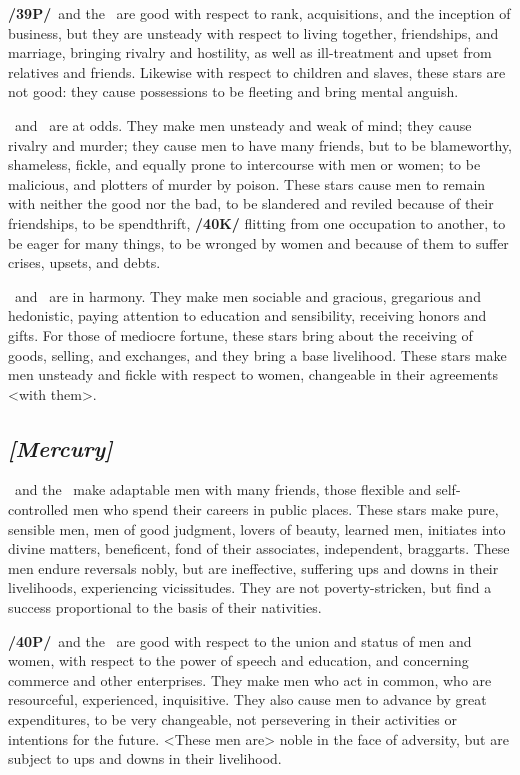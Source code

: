 \textbf{/39P/}\Venus\, and the \Moon\, are good with respect to rank, acquisitions, and the inception of business,
but they are unsteady with respect to living together, friendships, and marriage, bringing rivalry and hostility, as well as ill-treatment and upset from relatives and friends. Likewise with respect to children and slaves, these stars are not good: they cause possessions to be fleeting and bring mental anguish.

\Venus\, and \Mars\, are at odds. They make men unsteady and weak of mind; they cause rivalry and murder; they cause men to have many friends, but to be blameworthy, shameless, fickle, and equally prone to intercourse with men or women; to be malicious, and plotters of murder by poison. These stars cause men to remain with neither the good nor the bad, to be slandered and reviled because of their friendships, to
be spendthrift, \textbf{/40K/} flitting from one occupation to another, to be eager for many things, to be wronged by women and because of them to suffer crises, upsets, and debts.

\Venus\, and \Mercury\, are in harmony. They make men sociable and gracious, gregarious and hedonistic, paying attention to education and sensibility, receiving honors and gifts. For those of mediocre fortune, these stars bring about the receiving of goods, selling, and exchanges, and they bring a base livelihood. These stars make men unsteady and fickle with respect to women, changeable in their agreements <with
them>.

\secbr
{}
\subsection{\textit{[Mercury]}}
\Mercury\, and the \Sun\, make adaptable men with many friends, those flexible and self-controlled men who spend their careers in public places. These stars make pure, sensible men, men of good judgment, lovers of beauty, learned men, initiates into divine matters, beneficent, fond of their associates, independent, braggarts. These men endure reversals nobly, but are ineffective, suffering ups and downs in their
livelihoods, experiencing vicissitudes. They are not poverty-stricken, but find a success proportional to the basis of their nativities.

\textbf{/40P/}\Mercury\, and the \Moon\, are good with respect to the union and status of men and women, with respect to the power of speech and education, and concerning commerce and other enterprises. They make men who act in common, who are resourceful, experienced, inquisitive. They also cause men to advance by great expenditures, to be very changeable, not persevering in their activities or intentions for the future.
<These men are> noble in the face of adversity, but are subject to ups and downs in their livelihood.

